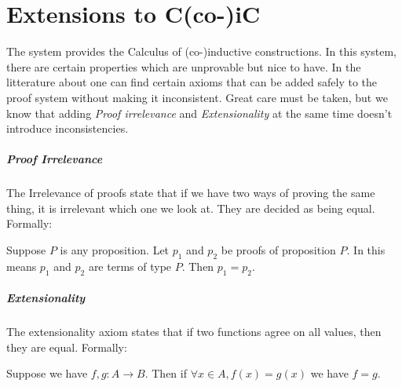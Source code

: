 \chapter{Extensions to C(co-)iC}

The \coq{} system provides the Calculus of (co-)inductive
constructions. In this system, there are certain properties which are
unprovable but nice to have. In the litterature about \coq{} one can
find certain axioms that can be added safely to the proof system
without making it inconsistent. Great care must be taken, but we know
that adding \emph{Proof irrelevance} and \emph{Extensionality} at the
same time doesn't introduce inconsistencies.

\paragraph{Proof Irrelevance}
\label{sec:proof-irrelevance}

The Irrelevance of proofs state that if we have two ways of proving
the same thing, it is irrelevant which one we look at. They are
decided as being equal. Formally:
\begin{axm}
  Suppose $P$ is any proposition. Let $p_1$ and $p_2$ be proofs of
  proposition $P$. In \coq{} this means $p_1$ and $p_2$ are terms of
  type $P$. Then $p_1 = p_2$.
\end{axm}

\paragraph{Extensionality}
\label{sec:extensionality}

The extensionality axiom states that if two functions agree on all
values, then they are equal. Formally:
\begin{axm}
  Suppose we have $f, g \colon A \to B$. Then if $\forall x \in A,
  f(x) = g(x)$ we have $f = g$.
\end{axm}


